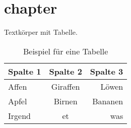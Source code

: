 \chapter{chapter}\label{ch:sub-chapter-21}

Textkörper mit Tabelle.

\begin{table*}[htbp]
    \centering
    \begin{tabular}{|l|c|r|}
        \hline
        \rowcolor[gray]{0.9}
        Spalte 1 & Spalte 2 & Spalte 3 \\
        \hline
        Affen & Giraffen & Löwen \\
        Apfel & Birnen & Bananen \\
        Irgend & et & was \\
        \hline
    \end{tabular}
    \caption{Beispiel für eine Tabelle}
    \label{tab:BeispielFuerEineTabelle}
\end{table*}